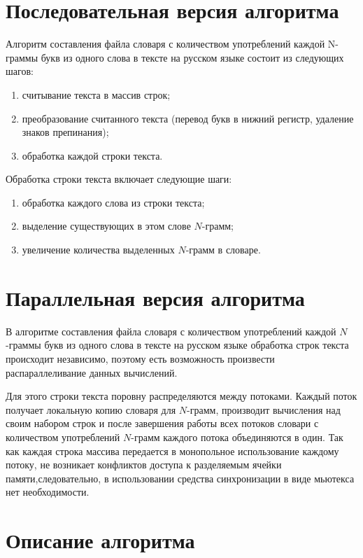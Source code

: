 \section{Последовательная версия алгоритма}

Алгоритм составления файла словаря с количеством употреблений каждой N-граммы букв из одного слова в тексте на русском языке состоит из следующих шагов:

\begin{enumerate}[label={\arabic*)}]
	\item считывание текста в массив строк;
	\item преобразование считанного текста (перевод букв в нижний регистр, удаление знаков препинания);
	\item обработка каждой строки текста.
\end{enumerate}

Обработка строки текста включает следующие шаги:

\begin{enumerate}[label={\arabic*)}]
	\item обработка каждого слова из строки текста;
	\item выделение существующих в этом слове $N$-грамм;
	\item увеличение количества выделенных $N$-грамм в словаре.
\end{enumerate}

\section{Параллельная версия алгоритма}

В алгоритме составления файла словаря с количеством употреблений каждой $N$-граммы букв из одного слова в тексте на русском языке обработка строк текста происходит независимо, поэтому есть возможность произвести распараллеливание данных вычислений. 

Для этого строки текста поровну распределяются между потоками. Каждый поток получает локальную копию словаря для $N$-грамм, производит вычисления над своим набором строк и после завершения работы всех потоков словари с количеством употреблений $N$-грамм каждого потока объединяются в один. 
Так как каждая строка массива передается в монопольное использование каждому потоку, не возникает конфликтов доступа к разделяемым ячейки памяти,следовательно, в использовании средства синхронизации в виде мьютекса нет необходимости.

\section{Описание алгоритма}

